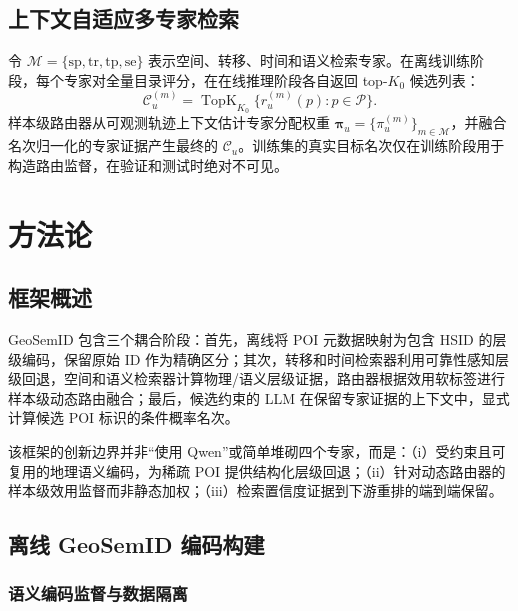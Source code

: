 \documentclass[10pt,fontset=none,twocolumn]{ctexart}
\newcommand{\Experts}{\mathcal{M}}
\newcommand{\POIs}{\mathcal{P}}
\begin{document}
\subsection{上下文自适应多专家检索}

令 $\Experts=\{\mathrm{sp},\mathrm{tr},\mathrm{tp},\mathrm{se}\}$ 表示空间、转移、时间和语义检索专家。在离线训练阶段，每个专家对全量目录评分，在在线推理阶段各自返回 top-$K_0$ 候选列表：
\begin{equation}
\mathcal{C}_{u}^{(m)}
=
\operatorname{TopK}_{K_0}
\{r_{u}^{(m)}(p):p\in\POIs\}.
\label{eq:expert_candidate}
\end{equation}
样本级路由器从可观测轨迹上下文估计专家分配权重 $\bm{\pi}_u=\{\pi_u^{(m)}\}_{m\in\Experts}$，并融合名次归一化的专家证据产生最终的 $\mathcal{C}_u$。训练集的真实目标名次仅在训练阶段用于构造路由监督，在验证和测试时绝对不可见。

\section{方法论}
\label{sec:method}

\subsection{框架概述}

GeoSemID 包含三个耦合阶段：首先，离线将 POI 元数据映射为包含 HSID 的层级编码，保留原始 ID 作为精确区分；其次，转移和时间检索器利用可靠性感知层级回退，空间和语义检索器计算物理/语义层级证据，路由器根据效用软标签进行样本级动态路由融合；最后，候选约束的 LLM 在保留专家证据的上下文中，显式计算候选 POI 标识的条件概率名次。

该框架的创新边界并非“使用 Qwen”或简单堆砌四个专家，而是：（i）受约束且可复用的地理语义编码，为稀疏 POI 提供结构化层级回退；（ii）针对动态路由器的样本级效用监督而非静态加权；（iii）检索置信度证据到下游重排的端到端保留。

\subsection{离线 GeoSemID 编码构建}
\label{subsec:geosemid}

\subsubsection{语义编码监督与数据隔离}
\end{document}
